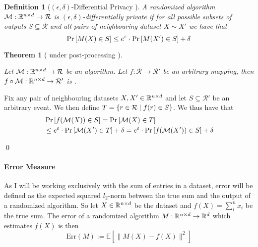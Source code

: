 \documentclass[a4paper,12pt]{article}
\renewenvironment{proof}{{\textit{Proof} \\}}{\qed}
\newtheorem{definition}{Definition}[section]
\newtheorem{theorem}{Theorem}
\begin{document}
\vspace*{0.3cm}
\begin{definition}[$(\epsilon, \delta)$-Differential Privacy \cite{dwork2016}]

A randomized algorithm $\mathcal{M}: \mathbb{R}^{n \times d} \rightarrow \mathcal{R}$ 
is $(\epsilon, \delta)$-differentially private if for all possible 
subsets of outputs $S \subseteq \mathcal{R}$ and all pairs of 
neighbouring dataset $X \sim X'$ we have that
\[ \Pr\left [M(X) \in S \right] \le e^{\varepsilon} \cdot \Pr\left [M(X') \in S \right] + \delta \]

\end{definition}

\begin{theorem}[ \edp under post-processing \cite{dpbasic}] %
\label{theo:PostProc}

Let $\mathcal{M}: \mathbb{R}^{n \times d} \rightarrow \mathcal{R}$ be an \edp 
algorithm. Let $f: \mathcal{R} \rightarrow \mathcal{R}'$ 
be an arbitrary mapping, then 
$f \circ \mathcal{M}: \mathbb{R}^{n \times d} \rightarrow \mathcal{R}'$ is \edp.

\end{theorem}

\begin{proof}

Fix any pair of neighbouring datasets $X, X' \in \mathbb{R}^{n \times d}$ and 
let $S \subseteq \mathcal{R}'$ be an arbitrary event. We then define 
$T = \left \{ r \in \mathcal{R} \; \text{\textbar} \; f(r) \in S\right\}$.
We thus have that
\begin{align*}
    &\Pr\left [f(\mathcal{M}(X)) \in S \right] = \Pr\left [\mathcal{M}(X) \in T \right] \\
    &\le e^{\varepsilon} \cdot \Pr\left [\mathcal{M}(X') \in T \right] + \delta = 
    e^{\varepsilon} \cdot \Pr\left [f(\mathcal{M}(X')) \in S \right] + \delta
\end{align*}
    
\end{proof}

    

\paragraph{Error Measure}
As I will be working exclusively with the sum of entries 
in a dataset, error will be defined as the expected
squared $l_2$-norm between the true sum and 
the output of a randomized algorithm.
So let $X \in \mathbb{R}^{n \times d}$ be the dataset and
$f(X) = \sum_i^n x_i$ be the true sum. The error of a
randomized algorithm $M : \mathbb{R}^{n \times d} \rightarrow \mathbb{R}^d$
which estimates $f(X)$ is then 
\[
    \text{Err}(M) := \mathbb{E} \left[ \| M(X) - f(X) \|^2 \right]
\]
\end{document}
